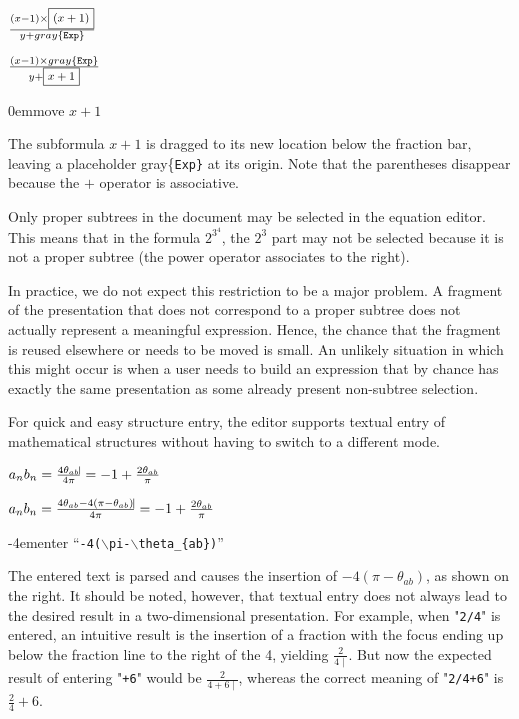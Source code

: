 \documentclass{speauth}
\begin{document}
\newcommand{\textcolor}[1]{#1}
\editStepScrshot
{$ \frac{(x-1)\times{ \framebox{\scriptsize $(x+1)$}}}{y + \textcolor{gray}{\{\tt Exp\}}}    $}
{\begin{normalsize}$ \frac{(x-1)\times{\textcolor{gray}{\{\tt Exp\}}} }{y + \framebox{\scriptsize $x+1$}}{\vrule height1.8ex width-2.5pt depth1.99ex} $ \end{normalsize}}
{0em}{\small move $x+1$}

The subformula $x+1$ is dragged to its new location below the fraction bar, leaving a placeholder \textcolor{gray}{\{\tt Exp\}} at its origin. Note that the parentheses disappear because the $+$ operator is associative. 

Only proper subtrees in the document may be selected in the equation editor. This means that in the formula $2^{3^4}$, 
the $2^3$ part may not be selected because it is not a proper subtree (the power operator associates to the right). 

In practice, we do not expect this restriction to be a major problem. A fragment of the presentation that does not correspond to a proper subtree does not actually represent a meaningful expression. Hence, the chance that the fragment is reused elsewhere or needs to be moved is small. An unlikely situation in which this might occur is when a user needs to build an expression that by chance has exactly the same presentation as some already present non-subtree selection.


For quick and easy structure entry, the editor supports textual entry of mathematical structures without having to switch to a different mode.


\editStepScrshot
{\begin{normalsize}$a_nb_n = \frac{4\theta_{ab}\vline}{4\pi } = -1 + \frac{2\theta_{ab}}{\pi}$ \end{normalsize}}
{\begin{normalsize}$a_nb_n = \frac{4\theta_{ab} - 4(\pi - \theta_{ab})\vline}{4\pi } = -1 + \frac{2\theta_{ab}}{\pi}$ \end{normalsize}}
{-4em}{\small enter  ``{\tt -4($\backslash$pi-$\backslash$theta\_\{ab\})}'' }



The entered text is parsed and causes the insertion of $- 4(\pi - \theta_{ab})$, as shown on the right.  It should be noted, however, that textual entry does not always lead to the desired result in a two-dimensional presentation. For example, when "\verb|2/4|" is entered, an intuitive result is the insertion of a fraction with the focus ending up below the fraction line to the right of the 4, yielding {$\frac{2}{4\mid}$}. But now the expected result of entering "\verb|+6|" would be {$\frac{2}{4+6\mid}$}, whereas the correct meaning of "\verb|2/4+6|" is $\frac{2}{4}+6$.
\end{document}
